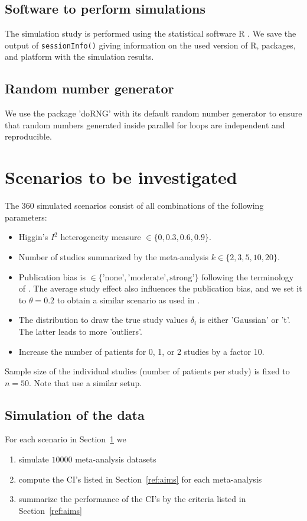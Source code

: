 \documentclass[letterpaper, 9pt]{article}
\begin{document}
\subsection{Software to perform simulations}
The simulation study is performed using the statistical software R \cite{R}.
We save the output of \texttt{sessionInfo()} giving information on the used version of R, packages, and platform with the simulation results.



\subsection{Random number generator}
We use the package 'doRNG' with its default random number generator to ensure that random numbers generated inside parallel for loops are independent and reproducible.


\section{Scenarios to be investigated} \label{sec:scenario}
The $360$ simulated scenarios consist of all combinations of the following parameters:
\begin{itemize}
\item Higgin's $I^2$ heterogeneity measure $\in \{0, 0.3, 0.6, 0.9\}$.
\item Number of studies summarized by the meta-analysis $k \in \{2, 3, 5, 10, 20\}$.
\item Publication bias is  $\in \{\text{'none'}, \text{'moderate'}, \text{strong'}\}$ following the terminology of \cite{henm:copa:10}.
  The average study effect also influences the publication bias, and we set it to $\theta = 0.2$ to obtain a similar scenario as used in \cite{henm:copa:10}.
\item The distribution to draw the true study values $\delta_i$ is either 'Gaussian' or 't'. The latter leads to more 'outliers'.
\item Increase the number of patients for 0, 1, or 2 studies by a factor 10. 
\end{itemize}
Sample size of the individual studies (number of patients per study) is fixed to $n = 50$. Note that \cite{IntHoutIoannidis} use a similar setup.


\subsection{Simulation of the data}
For each scenario in Section~\ref{sec:scenario} we
\begin{enumerate}
\item simulate $10000$ meta-analysis datasets
\item compute the CI's listed in Section~\ref{ref:aims} for each meta-analysis
\item summarize the performance of the CI's by the criteria listed in Section~\ref{ref:aims}
\end{enumerate}
\end{document}
